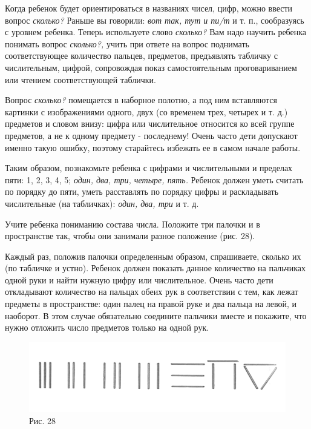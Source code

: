 \documentclass[a5paper]{book}
\renewcommand{\emph}[1]{\textit{#1}}
\begin{document}
Когда ребенок будет ориентироваться в названиях чисел, цифр, можно
ввести вопрос \emph{сколько?} Раньше вы говорили: \emph{вот так, тут и
пи/т} и т. п., сообразуясь с уровнем ребенка. Теперь используете слово
\emph{сколько?} Вам надо научить ребенка понимать вопрос
\emph{сколько?,} учить при ответе на вопрос поднимать соответствующее
количество пальцев, предметов, предъявлять табличку с числительным,
цифрой, сопровождая показ самостоятельным проговариванием или чтением
соответствующей таблички.

Вопрос \emph{сколько?} помещается в наборное полотно, а под ним
вставляются картинки с изображениями одного, двух (со временем трех,
четырех и т. д.) предметов и словом внизу: цифра или числительное
относится ко всей группе предметов, а не к одному предмету - последнему!
Очень часто дети допускают именно такую ошибку, поэтому старайтесь
избежать ее в самом начале работы.

Таким образом, познакомьте ребенка с цифрами и числительными и пределах
пяти: 1, 2, 3, 4, 5; \emph{один, два, три, четыре, пять.} Ребенок должен
уметь считать по порядку до пяти, уметь расставлять по порядку цифры и
раскладывать числительные (на табличках): \emph{один, два, три} и т. д.

Учите ребенка пониманию состава числа. Положите три палочки и в
пространстве так, чтобы они занимали разное положение (рис. 28).

Каждый раз, положив палочки определенным образом, спрашиваете, сколько
их (по табличке и устно). Ребенок должен показать данное количество на
пальчиках одной руки и найти нужную цифру или числительное. Очень часто
дети откладывают количество на пальцах обеих рук в соответствии с тем,
как лежат предметы в пространстве: один палец на правой руке и два
пальца на левой, и наоборот. В этом случае обязательно соедините
пальчики вместе и покажите, что нужно отложить число предметов только на
одной рук.

\begin{figure}
\centering
\includegraphics[width=\linewidth]{media/media/image25.png}
\caption*{Рис. 28}
\end{figure}
\end{document}
